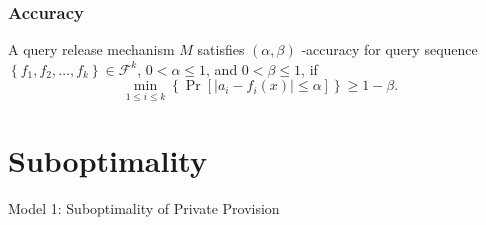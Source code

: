 \begin{frame}[allowframebreaks]%
\frametitle{Accuracy}
\begin{definition}
\label{def:acc} A query release mechanism $M$ satisfies $(\alpha ,\beta )$%
-accuracy for query sequence $\left\{ f_{1},f_{2},\ldots ,f_{k}\right\} \in
\mathcal{F}^{k}$, $0<\alpha \leq 1$, and $0<\beta \leq 1$, if
$$\min_{1\leq i\leq k}\left\{ \Pr \left[ |a_{i}-f_{i}(x)|\leq \alpha \right] \right\} \geq
1-\beta. $$%
\end{definition}

\end{frame}%
%

\section[Suboptimality]{Suboptimality}

\begin{frame}[allowframebreaks]%

\begin{center}
	{\Large Model 1: Suboptimality of Private Provision}
\end{center}



\end{frame}%
%

